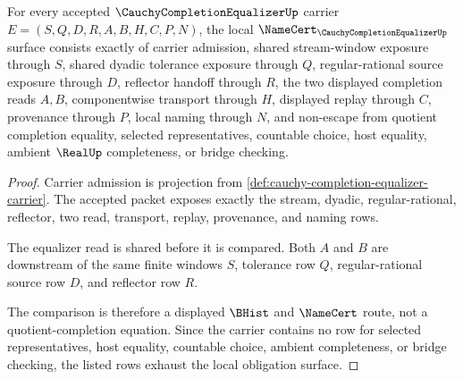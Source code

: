 \begin{theorem}
\label{thm:cauchy-completion-equalizer-namecert-obligations}
For every accepted $\CauchyCompletionEqualizerUp$ carrier $E=(S,Q,D,R,A,B,H,C,P,N)$, the local $\NameCert_{\CauchyCompletionEqualizerUp}$ surface consists exactly of carrier admission, shared stream-window exposure through $S$, shared dyadic tolerance exposure through $Q$, regular-rational source exposure through $D$, reflector handoff through $R$, the two displayed completion reads $A,B$, componentwise transport through $H$, displayed replay through $C$, provenance through $P$, local naming through $N$, and non-escape from quotient completion equality, selected representatives, countable choice, host equality, ambient $\RealUp$ completeness, or bridge checking.
\end{theorem}
\begin{proof}
Carrier admission is projection from \autoref{def:cauchy-completion-equalizer-carrier}. The accepted packet exposes exactly the stream, dyadic, regular-rational, reflector, two read, transport, replay, provenance, and naming rows.

The equalizer read is shared before it is compared. Both $A$ and $B$ are downstream of the same finite windows $S$, tolerance row $Q$, regular-rational source row $D$, and reflector row $R$.

The comparison is therefore a displayed $\BHist$ and $\NameCert$ route, not a quotient-completion equation. Since the carrier contains no row for selected representatives, host equality, countable choice, ambient completeness, or bridge checking, the listed rows exhaust the local obligation surface.
\end{proof}

